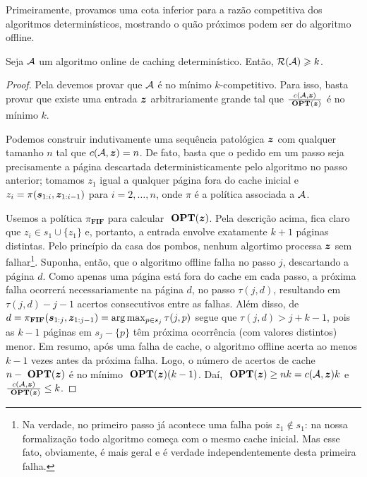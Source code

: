 Primeiramente, provamos uma cota inferior para a razão competitiva dos algoritmos determinísticos, mostrando o quão próximos podem ser do algoritmo offline.

\begin{theorem}
\label{teo:cota_det}
Seja \(\mathcal{A}\) um algoritmo online de caching determinístico. Então, \(\mathcal{R}(\mathcal{A}) \geqslant k\).
\end{theorem}

\begin{proof}

  Pela  devemos provar que \(\mathcal{A}\) é no mínimo \(k\)-competitivo. Para isso, basta provar que existe uma entrada \(\bm{z}\) arbitrariamente grande tal que \(\frac{c(\mathcal{A},\bm{z})} {\ \textbf{OPT}(\bm{z})}\) é no mínimo \(k\). 

  Podemos construir indutivamente uma sequência patológica \(\bm{z}\) com qualquer tamanho \(n\) tal que \(c(\mathcal{A}, \bm{z}) = n\). De fato, basta que o pedido em um passo seja precisamente a página descartada deterministicamente pelo algoritmo no passo anterior; tomamos \(z_1\) igual a qualquer página fora do cache inicial e \(z_i = \pi(\bm{s}_{1:i}, \bm{z}_{1:i-1})\) para \(i = 2, \dotsc, n\), onde \(\pi\) é a política associada a \(\mathcal{A}\).

  Usemos a política \(\pi_{\mathbf{FIF}}\) para calcular \(\ \textbf{OPT}(\bm{z})\). Pela descrição acima, fica claro que \(z_i \in s_1 \cup \{z_1\}\) e, portanto, a entrada envolve exatamente \(k+1\) páginas distintas. Pelo princípio da casa dos pombos, nenhum algortimo processa \(\bm{z}\) sem falhar\footnote{Na verdade, no primeiro passo já acontece uma falha pois \(z_1 \notin s_1\): na nossa formalização todo algoritmo começa com o mesmo cache inicial. Mas esse fato, obviamente, é mais geral e é verdade independentemente desta primeira falha.}. Suponha, então, que o algoritmo offline falha no passo \(j\), descartando a página \(d\). Como apenas uma página está fora do cache em cada passo, a próxima falha ocorrerá necessariamente na página \(d\), no passo \(\tau(j,d)\), resultando em \(\tau(j,d) - j - 1\) acertos consecutivos entre as falhas. Além disso, de \(d = \pi_{\mathbf{FIF}}(\bm{s}_{1:j}, \bm{z}_{1:j-1}) = \arg\max_{p \in s_j} \tau(j, p)\) segue que \(\tau(j, d) > j + k - 1\), pois as \(k - 1\) páginas em \(s_j - \{p\}\) têm próxima ocorrência (com valores distintos) menor. Em resumo, após uma falha de cache, o algoritmo offline acerta ao menos \(k-1\) vezes antes da próxima falha. Logo, o número de acertos de cache \(n-\ \textbf{OPT}(\bm{z})\) é no mínimo \(\ \textbf{OPT}(\bm{z})(k-1)\). Daí, \(\ \textbf{OPT}(\bm{z}) \ge nk = c(\mathcal{A},\bm{z})k\) e \(\frac{c(\mathcal{A},\bm{z})}{\ \textbf{OPT}(\bm{z})} \le k\).

\end{proof}

